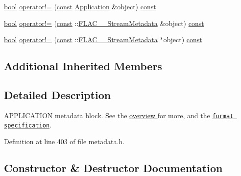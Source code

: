 {\bf }\par
\begin{DoxyCompactItemize}
\item 
\hyperlink{mac_2config_2i386_2lib-src_2libsoxr_2soxr-config_8h_abb452686968e48b67397da5f97445f5b}{bool} \hyperlink{class_f_l_a_c_1_1_metadata_1_1_application_a381c844b7a30a0d427495d40a04f390f}{operator!=} (\hyperlink{getopt1_8c_a2c212835823e3c54a8ab6d95c652660e}{const} \hyperlink{class_f_l_a_c_1_1_metadata_1_1_application}{Application} \&object) \hyperlink{getopt1_8c_a2c212835823e3c54a8ab6d95c652660e}{const} 
\item 
\hyperlink{mac_2config_2i386_2lib-src_2libsoxr_2soxr-config_8h_abb452686968e48b67397da5f97445f5b}{bool} \hyperlink{class_f_l_a_c_1_1_metadata_1_1_application_af1bc45d6f584423c9cd6b59f23e7d49e}{operator!=} (\hyperlink{getopt1_8c_a2c212835823e3c54a8ab6d95c652660e}{const} \+::\hyperlink{struct_f_l_a_c_____stream_metadata}{F\+L\+A\+C\+\_\+\+\_\+\+Stream\+Metadata} \&object) \hyperlink{getopt1_8c_a2c212835823e3c54a8ab6d95c652660e}{const} 
\item 
\hyperlink{mac_2config_2i386_2lib-src_2libsoxr_2soxr-config_8h_abb452686968e48b67397da5f97445f5b}{bool} \hyperlink{class_f_l_a_c_1_1_metadata_1_1_application_a1bc922263fb36e5db3a42c13990d1563}{operator!=} (\hyperlink{getopt1_8c_a2c212835823e3c54a8ab6d95c652660e}{const} \+::\hyperlink{struct_f_l_a_c_____stream_metadata}{F\+L\+A\+C\+\_\+\+\_\+\+Stream\+Metadata} $\ast$object) \hyperlink{getopt1_8c_a2c212835823e3c54a8ab6d95c652660e}{const} 
\end{DoxyCompactItemize}

\subsection*{Additional Inherited Members}


\subsection{Detailed Description}
A\+P\+P\+L\+I\+C\+A\+T\+I\+ON metadata block. See the \hyperlink{group__flacpp__metadata__object}{overview } for more, and the \href{../format.html#metadata_block_application}{\tt format specification}. 

Definition at line 403 of file metadata.\+h.



\subsection{Constructor \& Destructor Documentation}
